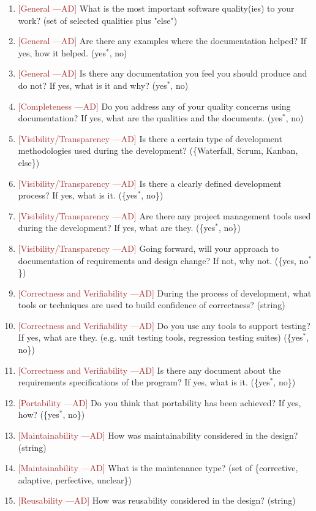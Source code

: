 \documentclass[letterpaper,cleveref]{lipics-v2019}
\newcommand{\authornote}[3]{\textcolor{#1}{[#3 ---#2]}}
\newcommand{\authornote}[3]{}
\newcommand{\ad}[1]{\authornote{brown}{AD}{#1}} %
\theoremstyle{definition}
\begin{document}
\begin{enumerate}
\item \ad{General} What is the most important software quality(ies) to your work? (set of selected qualities plus "else")
\item \ad{General} Are there any examples where the documentation helped? If yes, how it helped. ({yes$^*$, no})
\item \ad{General} Is there any documentation you feel you should produce and do not? If yes, what is it and why? ({yes$^*$, no})
\item \ad{Completeness} Do you address any of your quality concerns using documentation? If yes, what are the qualities and the documents. ({yes$^*$, no})
\item \ad{Visibility/Transparency} Is there a certain type of development methodologies used during the development? (\{Waterfall, Scrum, Kanban, else\})
\item \ad{Visibility/Transparency} Is there a clearly defined development process? If yes, what is it. (\{yes$^*$, no\})
\item \ad{Visibility/Transparency} Are there any project management tools used during the development? If yes, what are they. (\{yes$^*$, no\})
\item \ad{Visibility/Transparency} Going forward, will your approach to documentation of requirements and design
change? If not, why not. (\{yes, no$^*$\})
\item \ad{Correctness and Verifiability} During the process of development, what tools or techniques are used to build confidence of correctness? (string)
\item \ad{Correctness and Verifiability} Do you use any tools to support testing? If yes, what are they. (e.g. unit testing tools, regression testing suites) (\{yes$^*$, no\})
\item \ad{Correctness and Verifiability} Is there any document about the requirements specifications of the program? If yes, what is it. (\{yes$^*$, no\})
\item \ad{Portability} Do you think that portability has been achieved? If yes, how? (\{yes$^*$, no\})
\item \ad{Maintainability} How was maintainability considered in the design? (string)
\item \ad{Maintainability} What is the maintenance type? (set of \{corrective, adaptive, perfective,
unclear\})
\item \ad{Reusability} How was reusability considered in the design? (string)

\end{enumerate}
\end{document}
